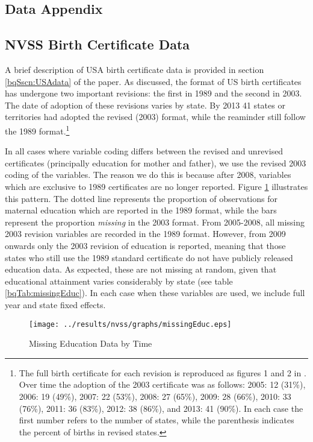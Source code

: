 \documentclass[a4paper, 11 pt]{article}
\theoremstyle{plain}
\begin{document}
\begin{spacing}{1.2}
\section{Data Appendix}
\label{bqScn:datApp}
\subsection{NVSS Birth Certificate Data}
A brief description of USA birth certificate data is provided in section 
\ref{bqSscn:USAdata} of the paper.  As discussed, the format of US birth
certificates has undergone two important revisions: the first in 1989
and the second in 2003.  The date of adoption of these revisions varies 
by state.  By 2013 41 states or territories had adopted the revised (2003)
format, while the reaminder still follow the 1989 format.\footnote{The full
birth certificate for each revision is reproduced as figures 1 and 2 in
\citet{MenackerMartin2005}.  Over time the adoption of the 2003 certificate 
was as follows: 2005: 12 (31\%), 2006: 19 (49\%), 2007: 22 (53\%), 2008: 27 
(65\%), 2009: 28 (66\%), 2010: 33 (76\%), 2011: 36 (83\%), 2012: 38 (86\%),
and 2013: 41 (90\%).  In each case the first number refers to the number
of states, while the parenthesis indicates the percent of births in revised
states.}

In all cases where variable coding differs between the revised and unrevised
certificates (principally education for mother and father), we use the revised
2003 coding of the variables.  The reason we do this is because after 2008,
variables which are exclusive to 1989 certificates are no longer reported.
Figure \ref{bqFig:educMissing} illustrates this pattern.  The dotted line 
represents the proportion of observations for maternal education which are
reported in the 1989 format, while the bars represent the proportion 
\emph{missing} in the 2003 format.  From 2005-2008, all missing 2003 revision
variables are recorded in the 1989 format.  However, from 2009 onwards only
the 2003 revision of education is reported, meaning that those states who
still use the 1989 standard certificate do not have publicly released education
data.  As expected, these are not missing at random, given that educational
attainment varies considerably by state (see table \ref{bqTab:missingEduc}).
In each case when these variables are used, we include full year and state
fixed effects.  
\begin{figure}[htpb!]
\caption{Missing Education Data by Time}
\label{bqFig:educMissing}
\texttt{[image: ../results/nvss/graphs/missingEduc.eps]}
\end{figure}



\end{spacing}
\end{document}
